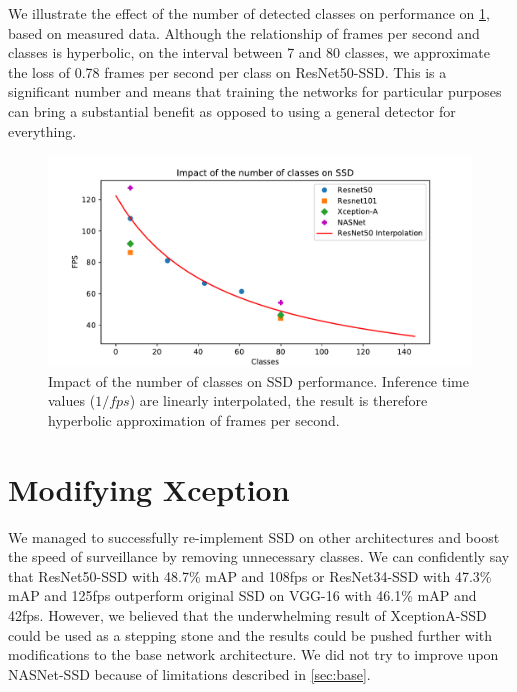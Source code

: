 We illustrate the effect of the number of detected classes on performance on \cref{fig:fpscls}, based on measured data. Although the relationship of frames per second and classes is hyperbolic, on the interval between 7 and 80 classes, we approximate the loss of 0.78 frames per second per class on ResNet50-SSD. This is a significant number and means that training the networks for particular purposes can bring a substantial benefit as opposed to using a general detector for everything.

\begin{figure}
    \centering
    \includegraphics[width=\textwidth]{img/fps_cls}
    \caption[Impact of the number of classes on SSD performance]{Impact of the number of classes on SSD performance. Inference time values ($1/fps$) are linearly interpolated, the result is therefore hyperbolic approximation of frames per second.}
    \label{fig:fpscls}
\end{figure}


\section{Modifying Xception}
\label{sec:fixxception}
We managed to successfully re-implement SSD on other architectures and boost the speed of surveillance by removing unnecessary classes. We can confidently say that ResNet50-SSD with 48.7\% mAP and 108fps or ResNet34-SSD with 47.3\% mAP and 125fps outperform original SSD on VGG-16 with 46.1\% mAP and 42fps. However, we believed that the underwhelming result of XceptionA-SSD could be used as a stepping stone and the results could be pushed further with modifications to the base network architecture. We did not try to improve upon NASNet-SSD because of limitations described in \cref{sec:base}.

